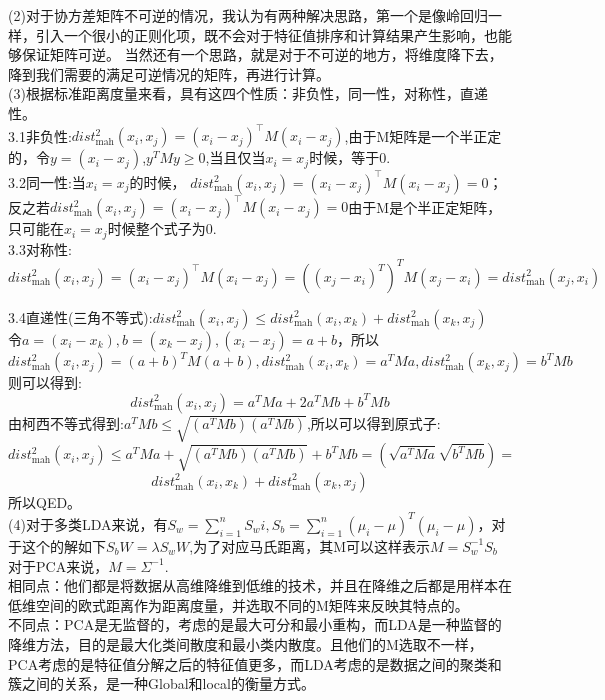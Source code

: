 \documentclass[answers]{exam}  %
\begin{document}
\begin{questions}
\begin{solution}
\begin{parts}
    (2)对于协方差矩阵不可逆的情况，我认为有两种解决思路，第一个是像岭回归一样，引入一个很小的正则化项，既不会对于特征值排序和计算结果产生影响，也能够保证矩阵可逆。
    当然还有一个思路，就是对于不可逆的地方，将维度降下去，降到我们需要的满足可逆情况的矩阵，再进行计算。\\
    
    (3)根据标准距离度量来看，具有这四个性质：非负性，同一性，对称性，直递性。\\
    3.1非负性:$dist_{\text{mah}}^2(x_i, x_j) = (x_i - x_j)^\top M (x_i - x_j)$,由于M矩阵是一个半正定的，令$y = (x_i - x_j)$,$y^T M y \geq 0$,当且仅当$x_i = x_j$时候，等于0.\\
    
    3.2同一性:当$x_i = x_j$的时候， $dist_{\text{mah}}^2(x_i, x_j) = (x_i - x_j)^\top M (x_i - x_j) = 0$；反之若$dist_{\text{mah}}^2(x_i, x_j) = (x_i - x_j)^\top M (x_i - x_j) = 0$由于M是个半正定矩阵，只可能在$x_i = x_j$时候整个式子为0.\\
    
    3.3对称性:
    \[
        dist_{\text{mah}}^2(x_i, x_j) = (x_i - x_j)^\top M (x_i - x_j) = ((x_j - x_i)^T)^T M (x_j - x_i) = dist_{\text{mah}}^2(x_j, x_i)
    \]
    
    3.4直递性(三角不等式):$dist_{\text{mah}}^2(x_i, x_j) \leq dist_{\text{mah}}^2(x_i, x_k) + dist_{\text{mah}}^2(x_k, x_j)$\\
    令$a = (x_i - x_k), b = (x_k - x_j), (x_i -x_j) = a+b$，所以
    \[
        dist_{\text{mah}}^2(x_i, x_j) = (a+b)^T M (a+b),dist_{\text{mah}}^2(x_i, x_k) = a^T M a,dist_{\text{mah}}^2(x_k, x_j) = b^T M b
    \]
    则可以得到:
    \[
        dist_{\text{mah}}^2(x_i, x_j) =a^T M a + 2a^T M b + b^T M b 
    \]
    由柯西不等式得到:$a^T M b \leq \sqrt{(a^T M b)(a^T M b)}$,所以可以得到原式子:
    \[
        dist_{\text{mah}}^2(x_i, x_j) \leq a^T M a +  \sqrt{(a^T M b)(a^T M b)} + b^T M b = (\sqrt{a^T Ma}\sqrt{b^T Mb}) = 
    \]    
    \[
        dist_{\text{mah}}^2(x_i, x_k) + dist_{\text{mah}}^2(x_k, x_j)
    \]
    所以QED。\\
    (4)对于多类LDA来说，有$S_w = \sum_{i=1}^{n}S_wi, S_b = \sum_{i=1}^{n} (\mu_i - \mu)^T (\mu_i - \mu)$，对于这个的解如下$S_b W = \lambda S_w W$,为了对应马氏距离，其M可以这样表示$M = S_w^{-1}S_b$\\
    对于PCA来说，$M = \Sigma^{-1}$.\\
    相同点：他们都是将数据从高维降维到低维的技术，并且在降维之后都是用样本在低维空间的欧式距离作为距离度量，并选取不同的M矩阵来反映其特点的。\\
    不同点：PCA是无监督的，考虑的是最大可分和最小重构，而LDA是一种监督的降维方法，目的是最大化类间散度和最小类内散度。且他们的M选取不一样，PCA考虑的是特征值分解之后的特征值更多，而LDA考虑的是数据之间的聚类和簇之间的关系，是一种Global和local的衡量方式。\\

\end{parts}
\end{solution}
\end{questions}
\end{document}
